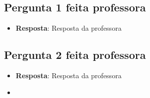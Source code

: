\documentclass[
]{book}
\providecommand{\tightlist}{%
  \setlength{\itemsep}{0pt}\setlength{\parskip}{0pt}}
\begin{document}
\hypertarget{pergunta-1-feita-professora-1}{%
\subsection{Pergunta 1 feita professora}\label{pergunta-1-feita-professora-1}}

\begin{itemize}
\tightlist
\item
  \textbf{Resposta}: Resposta da professora
\end{itemize}

\hypertarget{pergunta-2-feita-professora-1}{%
\subsection{Pergunta 2 feita professora}\label{pergunta-2-feita-professora-1}}

\begin{itemize}
\tightlist
\item
  \textbf{Resposta}: Resposta da professora
\end{itemize}

\begin{itemize}
\tightlist
\item
\end{itemize}

  
\end{document}
